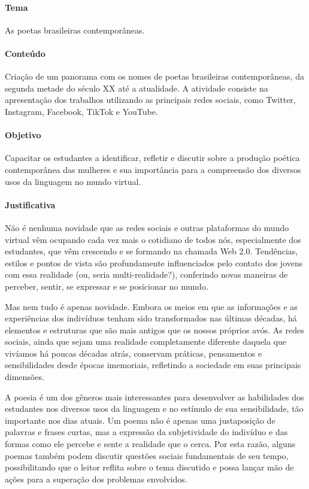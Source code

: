 \documentclass[12pt]{extarticle}
\begin{document}
\paragraph{Tema} As poetas brasileiras contemporâneas.

\paragraph{Conteúdo} Criação de um panorama com os nomes de poetas
brasileiras contemporâneas, da segunda metade do século XX até a
atualidade. A atividade consiste na apresentação dos trabalhos
utilizando as principais redes sociais, como Twitter, Instagram,
Facebook, TikTok e YouTube.

\paragraph{Objetivo} Capacitar os estudantes a identificar, refletir e
discutir sobre a produção poética contemporânea das mulheres e sua
importância para a compreensão dos diversos usos da linguagem no mundo
virtual.

\paragraph{Justificativa} Não é nenhuma novidade que as redes sociais e
outras plataformas do mundo virtual vêm ocupando cada vez mais o
cotidiano de todos nós, especialmente dos estudantes, que vêm crescendo
e se formando na chamada Web 2.0. Tendências, estilos e pontos de vista
são profundamente influenciados pelo contato dos jovens com essa
realidade (ou, seria multi-realidade?), conferindo novas maneiras de
perceber, sentir, se expressar e se posicionar no mundo.

Mas nem tudo é apenas novidade. Embora os meios em que as informações e
as experiências dos indivíduos tenham sido transformados nas últimas
décadas, há elementos e estruturas que são mais antigos que os nossos
próprios avós. As redes sociais, ainda que sejam uma realidade
completamente diferente daquela que vivíamos há poucas décadas atrás,
conservam práticas, pensamentos e sensibilidades desde épocas
imemoriais, refletindo a sociedade em suas principais dimensões.

A poesia é um dos gêneros mais interessantes para desenvolver as
habilidades dos estudantes nos diversos usos da linguagem e no estímulo
de sua sensibilidade, tão importante nos dias atuais. Um poema não é
apenas uma justaposição de palavras e frases curtas, mas a expressão da
subjetividade do indivíduo e das formas como ele percebe e sente a
realidade que o cerca. Por esta razão, alguns poemas também podem
discutir questões sociais fundamentais de seu tempo, possibilitando que
o leitor reflita sobre o tema discutido e possa lançar mão de ações para
a superação dos problemas envolvidos.
\end{document}
